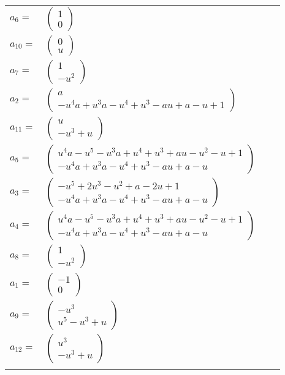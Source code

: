 \documentclass[1p]{elsarticle_modified}
\theoremstyle{definition}
\begin{document}
\begin{tabular}{m{7pt} m{180pt} m{7pt} m{180pt} }
\flushright $a_{6}=$&$\begin{pmatrix}1\\0\end{pmatrix}$ \\
\flushright $a_{10}=$&$\begin{pmatrix}0\\u\end{pmatrix}$ \\
\flushright $a_{7}=$&$\begin{pmatrix}1\\- u^2\end{pmatrix}$ \\
\flushright $a_{2}=$&$\begin{pmatrix}a\\- u^4 a+u^3 a- u^4+u^3- a u+a- u+1\end{pmatrix}$ \\
\flushright $a_{11}=$&$\begin{pmatrix}u\\- u^3+u\end{pmatrix}$ \\
\flushright $a_{5}=$&$\begin{pmatrix}u^4 a- u^5- u^3 a+u^4+u^3+a u- u^2- u+1\\- u^4 a+u^3 a- u^4+u^3- a u+a- u\end{pmatrix}$ \\
\flushright $a_{3}=$&$\begin{pmatrix}- u^5+2 u^3- u^2+a-2 u+1\\- u^4 a+u^3 a- u^4+u^3- a u+a- u\end{pmatrix}$ \\
\flushright $a_{4}=$&$\begin{pmatrix}u^4 a- u^5- u^3 a+u^4+u^3+a u- u^2- u+1\\- u^4 a+u^3 a- u^4+u^3- a u+a- u\end{pmatrix}$ \\
\flushright $a_{8}=$&$\begin{pmatrix}1\\- u^2\end{pmatrix}$ \\
\flushright $a_{1}=$&$\begin{pmatrix}-1\\0\end{pmatrix}$ \\
\flushright $a_{9}=$&$\begin{pmatrix}- u^3\\u^5- u^3+u\end{pmatrix}$ \\
\flushright $a_{12}=$&$\begin{pmatrix}u^3\\- u^3+u\end{pmatrix}$\\&\end{tabular}
\end{document}
